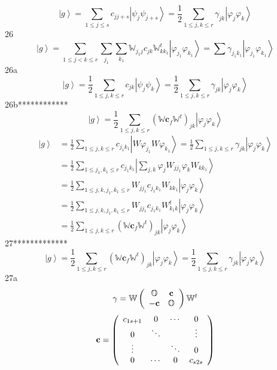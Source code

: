 \documentclass[aps,preprint]{revtex4}%
\begin{document}
\[
\left\vert g\right\rangle =\sum_{1\leq j\leq s}c_{jj+s}\left\vert \psi_{j}%
\psi_{j+s}\right\rangle =\frac{1}{2}\sum_{1\leq j,k\leq r}\gamma
_{jk}\left\vert \varphi_{j}\varphi_{k}\right\rangle
\]
26%
\[
\left\vert g\right\rangle =\sum_{1\leq j<k\leq r}\sum_{j_{1}}\sum_{k_{1}%
}\mathbb{W}_{j_{1}j}c_{jk}\mathbb{W}_{kk_{1}}^{t}\left\vert \varphi_{j_{1}%
}\varphi_{k_{1}}\right\rangle =\sum\gamma_{j_{1}k_{1}}\left\vert
\varphi_{j_{1}}\varphi_{k_{1}}\right\rangle
\]
26a%
\[
\left\vert g\right\rangle =\frac{1}{2}\sum_{1\leq j,k\leq r}c_{jk}\left\vert
\psi_{j}\psi_{k}\right\rangle =\frac{1}{2}\sum_{1\leq j,k\leq r}\gamma
_{jk}\left\vert \varphi_{j}\varphi_{k}\right\rangle
\]
26b************%
\[
\left\vert g\right\rangle =\frac{1}{2}\sum_{1\leq j,k\leq r}\left(
\mathbb{W}\mathbf{c}_{f}\mathbb{W}^{t}\right)  _{jk}\left\vert \varphi
_{j}\varphi_{k}\right\rangle
\]%
\begin{align*}
\left\vert g\right\rangle  &  =\frac{1}{2}\sum_{1\leq j,k\leq r}c_{j_{1}k_{1}%
}\left\vert W\varphi_{j_{1}}W\varphi_{k_{1}}\right\rangle =\frac{1}{2}%
\sum_{1\leq j,k\leq r}\gamma_{jk}\left\vert \varphi_{j}\varphi_{k}%
\right\rangle \\
&  =\frac{1}{2}\sum_{1\leq j_{1},k_{1}\leq r}c_{j_{1}k_{1}}\left\vert
\sum_{j,k}\varphi_{j}W_{jj_{1}}\varphi_{k}W_{kk_{1}}\right\rangle \\
&  =\frac{1}{2}\sum_{1\leq j,k,j_{1},k_{1}\leq r}W_{jj_{1}}c_{j_{1}k_{1}%
}W_{kk_{1}}\left\vert \varphi_{j}\varphi_{k}\right\rangle \\
&  =\frac{1}{2}\sum_{1\leq j,k,j_{1},k_{1}\leq r}W_{jj_{1}}c_{j_{1}k_{1}%
}W_{k_{1}k}^{t}\left\vert \varphi_{j}\varphi_{k}\right\rangle \\
&  =\frac{1}{2}\sum_{1\leq j,k\leq r}\left(  \mathbb{W}\mathbf{c}%
_{f}\mathbb{W}^{t}\right)  _{jk}\left\vert \varphi_{j}\varphi_{k}%
\right\rangle
\end{align*}
27*************%
\[
\left\vert g\right\rangle =\frac{1}{2}\sum_{1\leq j,k\leq r}\left(
\mathbb{W}\mathbf{c}_{f}\mathbb{W}^{t}\right)  _{jk}\left\vert \varphi
_{j}\varphi_{k}\right\rangle =\frac{1}{2}\sum_{1\leq j,k\leq r}\gamma
_{jk}\left\vert \varphi_{j}\varphi_{k}\right\rangle
\]
27a%
\[
\mathbf{\gamma}=\mathbb{W}\left(
\begin{array}
[c]{cc}%
\mathbb{O} & \mathbf{c}\\
-\mathbf{c} & \mathbb{O}%
\end{array}
\right)  \mathbb{W}^{t}%
\]%
\[
\mathbf{c}=\left(
\begin{array}
[c]{cccc}%
c_{1s+1} & 0 & \cdots & 0\\
0 & \ddots &  & \vdots\\
\vdots &  & \ddots & 0\\
0 & \cdots & 0 & c_{s2s}%
\end{array}
\right)
\]
\end{document}
